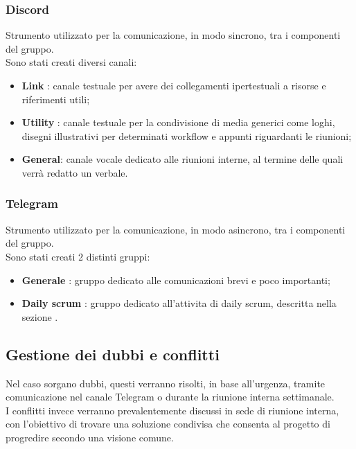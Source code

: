 \subsubsection{Discord}
Strumento utilizzato per la comunicazione, in modo sincrono, tra i componenti
del gruppo.\\ Sono stati creati diversi canali:
\begin{itemize}
    \item \textbf{Link} : canale testuale per avere dei collegamenti ipertestuali a risorse e riferimenti utili;
    \item \textbf{Utility} : canale testuale per la condivisione di media generici come loghi, disegni illustrativi per determinati workflow e appunti riguardanti le riunioni;
    \item \textbf{General}: canale vocale dedicato alle riunioni interne, al termine delle quali verrà redatto un verbale.
\end{itemize}

\subsubsection{Telegram}
Strumento utilizzato per la comunicazione, in modo asincrono, tra i componenti
del gruppo.\\ Sono stati creati 2 distinti gruppi:
\begin{itemize}
    \item \textbf{Generale} : gruppo dedicato alle comunicazioni brevi e poco importanti;
    \item \textbf{Daily scrum} : gruppo dedicato all'attivita di daily scrum, descritta nella sezione .
\end{itemize}

\subsection{Gestione dei dubbi e conflitti}
Nel caso sorgano dubbi, questi verranno risolti, in base all'urgenza, tramite
comunicazione nel canale Telegram o durante la riunione interna settimanale. \\
I conflitti invece verranno prevalentemente discussi in sede di riunione
interna, con l'obiettivo di trovare una soluzione condivisa che consenta al
progetto di progredire secondo una visione comune.

